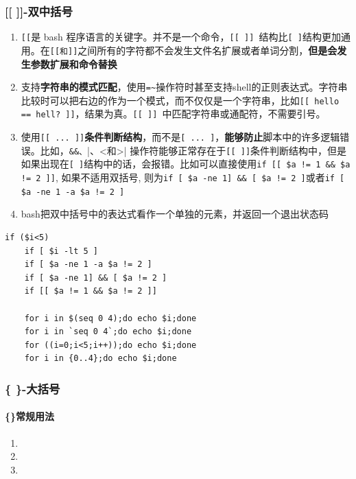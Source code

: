 \documentclass[UTF8,a4paper,12pt]{ctexbook}
\begin{document}
			\subsubsection{[[ ]]-双中括号}
				\begin{enumerate}
					\item \verb|[[|是 bash 程序语言的关键字。并不是一个命令，\verb|[[ ]] |结构比\verb|[ ]|结构更加通用。在\verb|[[和]]|之间所有的字符都不会发生文件名扩展或者单词分割，\textbf{但是会发生参数扩展和命令替换}
					
					\item 支持\textbf{字符串的模式匹配}，使用\verb|=~|操作符时甚至支持shell的正则表达式。字符串比较时可以把右边的作为一个模式，而不仅仅是一个字符串，比如\verb|[[ hello == hell? ]]|，结果为真。\verb|[[ ]] |中匹配字符串或通配符，不需要引号。
					
					\item 使用\verb|[[ ... ]]|\textbf{条件判断结构}，而不是\verb|[ ... ]|，\textbf{能够防止}脚本中的许多逻辑错误。比如，\verb|&&、||、<和>| 操作符能够正常存在于\verb|[[ ]]|条件判断结构中，但是如果出现在\verb|[ ]|结构中的话，会报错。比如可以直接使用\verb|if [[ $a != 1 && $a != 2 ]]|, 如果不适用双括号, 则为\verb|if [ $a -ne 1] && [ $a != 2 ]|或者\verb|if [ $a -ne 1 -a $a != 2 ]|
					
					\item bash把双中括号中的表达式看作一个单独的元素，并返回一个退出状态码
				\end{enumerate}
				
				\begin{lstlisting}[frame=L]
	if ($i<5)    
	if [ $i -lt 5 ]    
	if [ $a -ne 1 -a $a != 2 ]    
	if [ $a -ne 1] && [ $a != 2 ]    
	if [[ $a != 1 && $a != 2 ]]    
	
	for i in $(seq 0 4);do echo $i;done    
	for i in `seq 0 4`;do echo $i;done    
	for ((i=0;i<5;i++));do echo $i;done    
	for i in {0..4};do echo $i;done    				
				\end{lstlisting}
			\subsubsection{\{ \}-大括号}
				\paragraph{\{\}常规用法}
				\begin{enumerate}
					\item 
					
					\item 
					
					\item 
				\end{enumerate}
\end{document}
